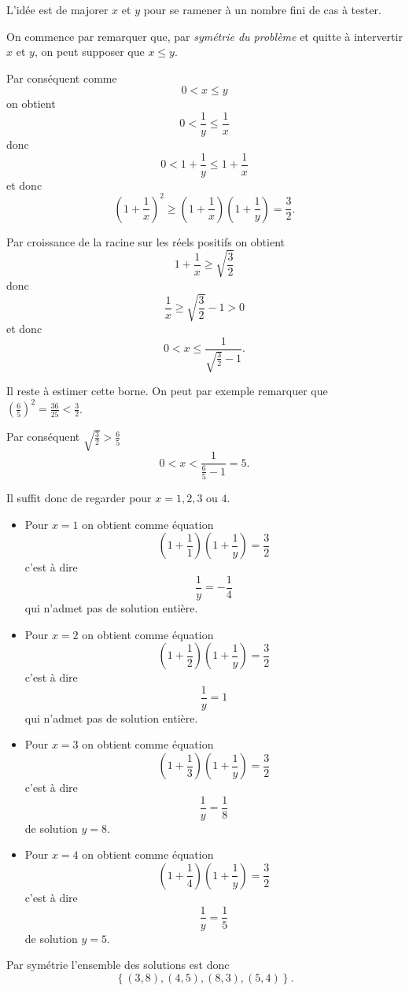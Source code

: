 \begin{sol}
	L'idée est de majorer $x$ et $y$ pour se ramener à un nombre fini de cas à tester.

	On commence par remarquer que, par \emph{symétrie du problème} et quitte à intervertir $x$ et $y$, on peut supposer que $x \leq y$.

	Par conséquent comme
	\[0 < x \leq y\]
	on obtient
	\[0 < \frac{1}{y} \leq \frac{1}{x}\]
	donc
	\[0 < 1+\frac{1}{y} \leq 1+\frac{1}{x}\]
	et donc
	\[\left(1 + \frac{1}{x} \right)^2 \geq \left( 1 + \frac{1}{x}\right) \left(1 + \frac{1}{y} \right) = \frac{3}{2}.\]

	Par croissance de la racine sur les réels positifs on obtient
	\[1 + \frac{1}{x} \geq \sqrt{\frac{3}{2}}\]
	donc
	\[\frac{1}{x} \geq \sqrt{\frac{3}{2}}-1 > 0\]
	et donc
	\[0 < x \leq \frac{1}{\sqrt{\frac{3}{2}}-1}.\]


	Il reste à estimer cette borne. On peut par exemple remarquer que $\left( \frac{6}{5}\right)^2 = \frac{36}{25} < \frac{3}{2}$.

	Par conséquent $\sqrt{\frac{3}{2}} > \frac{6}{5}$
	\[0 < x < \frac{1}{\frac{6}{5}-1} = 5.\]

	Il suffit donc de regarder pour $x =1, 2, 3 \text{ ou } 4$.

	\begin{itemize}
		\item Pour $x=1$ on obtient comme équation
		\[\left(1 + \frac{1}{1} \right)\left(1 + \frac{1}{y} \right) = \frac{3}{2}\]
		c'est à dire
		\[\frac{1}{y} = -\frac{1}{4}\]
		qui n'admet pas de solution entière.
		\item Pour $x=2$ on obtient comme équation
		\[\left(1 + \frac{1}{2} \right)\left(1 + \frac{1}{y} \right) = \frac{3}{2}\]
		c'est à dire
		\[\frac{1}{y} = 1\]
		qui n'admet pas de solution entière.
		\item Pour $x=3$ on obtient comme équation
		\[\left(1 + \frac{1}{3} \right)\left(1 + \frac{1}{y} \right) = \frac{3}{2}\]
		c'est à dire
		\[\frac{1}{y} = \frac{1}{8}\]
		de solution $y=8$.
		\item Pour $x=4$ on obtient comme équation
		\[\left(1 + \frac{1}{4} \right)\left(1 + \frac{1}{y} \right) = \frac{3}{2}\]
		c'est à dire
		\[\frac{1}{y} = \frac{1}{5}\]
		de solution $y=5$.
	\end{itemize}

	Par symétrie l'ensemble des solutions est donc
	\[\boxed{\left\lbrace (3,8), (4,5), (8,3), (5,4) \right\rbrace}.\]
\end{sol}

